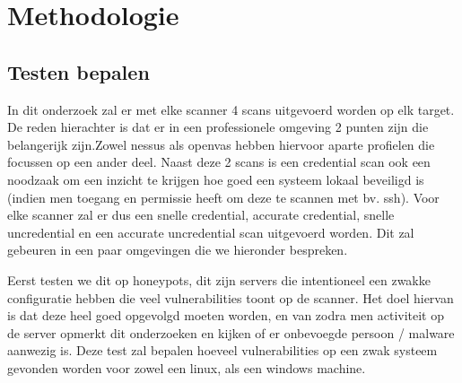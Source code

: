 
\chapter{Methodologie}
\label{ch:methodologie}





\section{Testen bepalen}

In dit onderzoek zal er met elke scanner 4 scans uitgevoerd worden op elk target. De reden hierachter is dat er in een professionele omgeving 2 punten zijn die belangerijk zijn.Zowel nessus als openvas hebben hiervoor aparte profielen die focussen op een ander deel. Naast deze 2 scans is een credential scan ook een noodzaak om een inzicht te krijgen hoe goed een systeem lokaal beveiligd is (indien men toegang en permissie heeft om deze te scannen met bv. ssh). Voor elke scanner zal er dus een snelle credential, accurate credential, snelle uncredential en een accurate uncredential scan uitgevoerd worden. Dit zal gebeuren in een paar omgevingen die we hieronder bespreken.

Eerst testen we dit op honeypots, dit zijn servers die intentioneel een zwakke configuratie hebben die veel vulnerabilities toont op de scanner. Het doel hiervan is dat deze heel goed opgevolgd moeten worden, en van zodra men activiteit op de server opmerkt dit onderzoeken en kijken of er onbevoegde persoon / malware aanwezig is. Deze test zal bepalen hoeveel vulnerabilities op een zwak systeem gevonden worden voor zowel een linux, als een windows machine.

